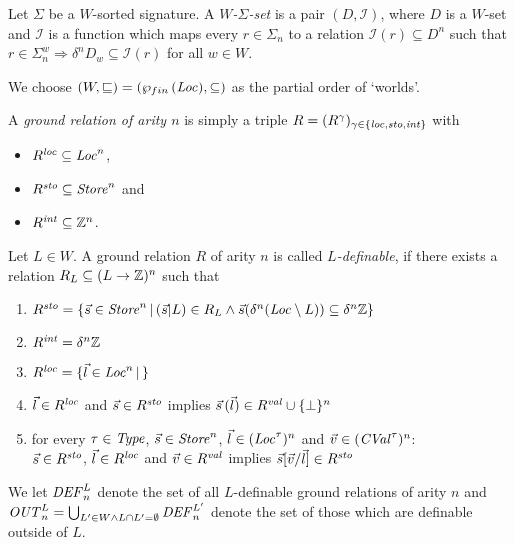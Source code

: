 \documentclass[12pt,a4paper]{report}
\newcommand{\CVal}{\nstyle{CVal}}
\newcommand{\loc}{\nstyle{loc}}
\newcommand{\sto}{\nstyle{sto}}
\newcommand{\val}{\nstyle{val}}
\newcommand{\z}{\nstyle{int}}
\newcommand{\DEF}{\nstyle{DEF}}
\newcommand{\OUT}{\nstyle{OUT}}
\newcommand{\I}{\mathcal{I}}
\begin{document}
\begin{definition}
  Let $\Sigma$ be a $W$-sorted signature. A {\em $W$-$\Sigma$-set} is a pair
  $(D,\I)$, where $D$ is a $W$-set and $\I$ is a function which maps every
  $r \in \Sigma_n$ to a relation $\I(r) \subseteq D^n$ such that
  $r \in \Sigma^w_n \Rightarrow \delta^n D_w \subseteq \I(r)$ for all $w \in W$.
\end{definition}

We choose $(W,\sqsubseteq) = (\wp_{fin}\,(\mathit{Loc}),\subseteq)$ as the partial order of `worlds'.

\begin{definition}
  A {\em ground relation of arity $n$} is simply a triple $R = (R^\gamma)_{\gamma\in\{\loc,\sto,\z\}}$ with
  \begin{itemize}
    \item $R^\loc \subseteq \Loc^n$,
    \item $R^\sto \subseteq \Store^n$ and
    \item $R^\z \subseteq \Int^n$.
  \end{itemize}
\end{definition}

\begin{definition}[$L$-definability]
  Let $L \in W$. A ground relation $R$ of arity $n$ is called {\em $L$-definable}, if there
  exists a relation $R_L \subseteq (L \to \mathbb Z)^n$ such that
  \begin{enumerate}
    \item $R^\sto = \{\vec{s}\in\Store^n\,|\,(\vec{s}|L)\in R_L
                      \wedge 
                      \vec{s}(\delta^n(\Loc \setminus L)) \subseteq \delta^n \Int\}$
    \item $R^\z = \delta^n \Int$
    \item $R^\loc = \{\vec{l}\in\Loc^n\,|\, \}$

    \item $\vec{l}\in R^\loc$ and $\vec{s}\in R^\sto$ implies
          $\vec{s}\,(\vec{l})\in R^\val \cup \{\bot\}^n$
    \item for every $\tau\in\mathit{Type}$, $\vec{s}\in\mathit{Store}^n$, $\vec{l}\in(\mathit{Loc}^\tau)^n$
          and $\vec{v}\in(\CVal^\tau)^n$: \\
          $\vec{s}\in R^\sto$, $\vec{l}\in R^\loc$ and $\vec{v}\in R^\val$ implies
          $\vec{s}[\vec{v}/\vec{l}]\in R^\sto$
  \end{enumerate}
\end{definition}

We let $\DEF^L_n$ denote the set of all $L$-definable ground relations
of arity $n$ and $\OUT^L_n = \bigcup_{L'\in W\wedge L \cap L' = \emptyset} \DEF^{L'}_n$ denote
the set of those which are definable outside of $L$.
\end{document}

